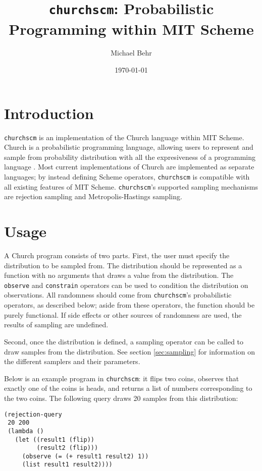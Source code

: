 \documentclass{article}
\title{\texttt{churchscm}: Probabilistic Programming within MIT Scheme}
\author{Michael Behr}
\date{\today}
\begin{document}
\maketitle

\section{Introduction}

\texttt{churchscm} is an implementation of the Church language within
MIT Scheme. Church is a probabilistic programming language, allowing
users to represent and sample from probability distribution with all
the expresiveness of a programming language
\cite{goodman_church:_2012}. Most current implementations of Church
are implemented as separate languages; by instead defining Scheme
operators, \texttt{churchscm} is compatible with all existing features
of MIT Scheme. \texttt{churchscm}'s supported sampling mechanisms are
rejection sampling and Metropolis-Hastings sampling.

\section{Usage}

A Church program consists of two parts. First, the user must specify
the distribution to be sampled from. The distribution should be
represented as a function with no arguments that draws a value from
the distribution. The \texttt{observe} and \texttt{constrain}
operators can be used to condition the distribution on
observations. All randomness should come from \texttt{churchscm}'s
probabilistic operators, as described below; aside from these
operators, the function should be purely functional. If side effects
or other sources of randomness are used, the results of sampling are
undefined.

Second, once the distribution is defined, a sampling operator can be
called to draw samples from the distribution. See section
\ref{sec:sampling} for information on the different samplers and their
parameters.

Below is an example program in \texttt{churchscm}: it flips two coins,
observes that exactly one of the coins is heads, and returns a list of
numbers corresponding to the two coins. The following query draws 20
samples from this distribution:

\begin{lstlisting}
(rejection-query
 20 200
 (lambda ()
   (let ((result1 (flip))
         (result2 (flip)))
     (observe (= (+ result1 result2) 1))
     (list result1 result2))))
\end{lstlisting}
\end{document}
